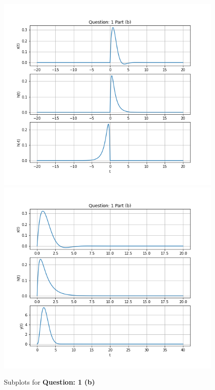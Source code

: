 \documentclass{article}
\begin{document}
    \begin{figure}[ht]
        \centering
        \includegraphics[scale=0.39]{./Assets/1-b-i.png}
        \includegraphics[scale=0.39]{./Assets/1-b-ii.png}
        \caption*{Subplots for \textbf{Question: 1 (b)}}
    \end{figure}
\end{document}
